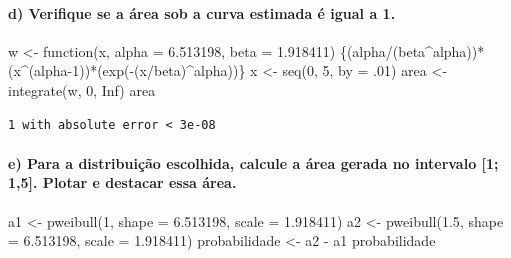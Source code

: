 \documentclass[
  letterpaper,
  DIV=11,
  numbers=noendperiod]{scrartcl}
\let\oldparagraph\paragraph
\renewcommand{\paragraph}[1]{\oldparagraph{#1}\mbox{}}
\newenvironment{Shaded}{\begin{snugshade}}{\end{snugshade}}
\newcommand{\AttributeTok}[1]{\textcolor[rgb]{0.40,0.45,0.13}{#1}}
\newcommand{\ConstantTok}[1]{\textcolor[rgb]{0.56,0.35,0.01}{#1}}
\newcommand{\ControlFlowTok}[1]{\textcolor[rgb]{0.00,0.23,0.31}{#1}}
\newcommand{\DecValTok}[1]{\textcolor[rgb]{0.68,0.00,0.00}{#1}}
\newcommand{\FloatTok}[1]{\textcolor[rgb]{0.68,0.00,0.00}{#1}}
\newcommand{\FunctionTok}[1]{\textcolor[rgb]{0.28,0.35,0.67}{#1}}
\newcommand{\NormalTok}[1]{\textcolor[rgb]{0.00,0.23,0.31}{#1}}
\newcommand{\OtherTok}[1]{\textcolor[rgb]{0.00,0.23,0.31}{#1}}
\newcommand{\SpecialCharTok}[1]{\textcolor[rgb]{0.37,0.37,0.37}{#1}}
\begin{document}
\hypertarget{d-verifique-se-a-uxe1rea-sob-a-curva-estimada-uxe9-igual-a-1.}{%
\paragraph{d) Verifique se a área sob a curva estimada é igual a
1.}\label{d-verifique-se-a-uxe1rea-sob-a-curva-estimada-uxe9-igual-a-1.}}

\begin{Shaded}
\begin{Highlighting}[]
\NormalTok{w }\OtherTok{\textless{}{-}} \ControlFlowTok{function}\NormalTok{(x, }\AttributeTok{alpha =} \FloatTok{6.513198}\NormalTok{, }\AttributeTok{beta =} \FloatTok{1.918411}\NormalTok{) \{(alpha}\SpecialCharTok{/}\NormalTok{(beta}\SpecialCharTok{\^{}}\NormalTok{alpha))}\SpecialCharTok{*}\NormalTok{(x}\SpecialCharTok{\^{}}\NormalTok{(alpha}\DecValTok{{-}1}\NormalTok{))}\SpecialCharTok{*}\NormalTok{(}\FunctionTok{exp}\NormalTok{(}\SpecialCharTok{{-}}\NormalTok{(x}\SpecialCharTok{/}\NormalTok{beta)}\SpecialCharTok{\^{}}\NormalTok{alpha))\}}
\NormalTok{x }\OtherTok{\textless{}{-}} \FunctionTok{seq}\NormalTok{(}\DecValTok{0}\NormalTok{, }\DecValTok{5}\NormalTok{, }\AttributeTok{by =}\NormalTok{ .}\DecValTok{01}\NormalTok{)}
\NormalTok{area }\OtherTok{\textless{}{-}} \FunctionTok{integrate}\NormalTok{(w, }\DecValTok{0}\NormalTok{, }\ConstantTok{Inf}\NormalTok{)}
\NormalTok{area}
\end{Highlighting}
\end{Shaded}

\begin{verbatim}
1 with absolute error < 3e-08
\end{verbatim}

\hypertarget{e-para-a-distribuiuxe7uxe3o-escolhida-calcule-a-uxe1rea-gerada-no-intervalo-1-15.-plotar-e-destacar-essa-uxe1rea.}{%
\paragraph{e) Para a distribuição escolhida, calcule a área gerada no
intervalo {[}1; 1,5{]}. Plotar e destacar essa
área.}\label{e-para-a-distribuiuxe7uxe3o-escolhida-calcule-a-uxe1rea-gerada-no-intervalo-1-15.-plotar-e-destacar-essa-uxe1rea.}}

\begin{Shaded}
\begin{Highlighting}[]
\NormalTok{a1 }\OtherTok{\textless{}{-}} \FunctionTok{pweibull}\NormalTok{(}\DecValTok{1}\NormalTok{, }\AttributeTok{shape =} \FloatTok{6.513198}\NormalTok{, }\AttributeTok{scale =} \FloatTok{1.918411}\NormalTok{)}
\NormalTok{a2 }\OtherTok{\textless{}{-}} \FunctionTok{pweibull}\NormalTok{(}\FloatTok{1.5}\NormalTok{, }\AttributeTok{shape =} \FloatTok{6.513198}\NormalTok{, }\AttributeTok{scale =} \FloatTok{1.918411}\NormalTok{)}
\NormalTok{probabilidade }\OtherTok{\textless{}{-}}\NormalTok{ a2 }\SpecialCharTok{{-}}\NormalTok{ a1}
\NormalTok{probabilidade}
\end{Highlighting}
\end{Shaded}
\end{document}
